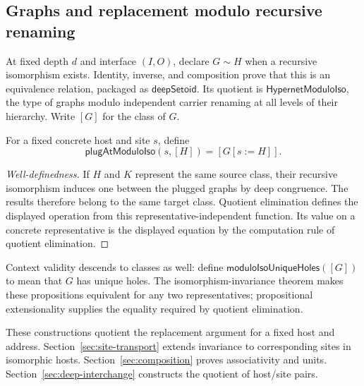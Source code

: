 \subsection{Graphs and replacement modulo recursive renaming}

\begin{definition}\label{term:recursive-quotient}
At fixed depth $d$ and interface $(I,O)$, declare $G\sim H$ when a recursive
isomorphism exists. Identity, inverse, and composition prove that this is an
equivalence relation, packaged as $\mathsf{deepSetoid}$. Its quotient is
$\mathsf{HypernetModuloIso}$, the type of graphs modulo independent carrier
renaming at all levels of their hierarchy. Write $[G]$ for the class of $G$.
\end{definition}

\begin{definition}\label{term:quotient-plugging}
For a fixed concrete host and site $s$, define
\[
 \mathsf{plugAtModuloIso}(s,[H])=[G[s:=H]].
\]
\end{definition}
\begin{proof}[Well-definedness]
If $H$ and $K$ represent the same source class, their recursive isomorphism
induces one between the plugged graphs by deep congruence. The results therefore
belong to the same target class. Quotient elimination defines the displayed
operation from this representative-independent function. Its value on a
concrete representative is the displayed equation by the computation rule of
quotient elimination.
\end{proof}
Context validity descends to classes as well: define
$\mathsf{moduloIsoUniqueHoles}([G])$ to mean that $G$ has unique holes. The
isomorphism-invariance theorem makes these propositions equivalent for any two
representatives; propositional extensionality supplies the equality required by
quotient elimination.

These constructions quotient the replacement argument for a fixed host and
address. Section~\ref{sec:site-transport} extends invariance to corresponding sites in
isomorphic hosts. Section~\ref{sec:composition} proves associativity and units.
Section~\ref{sec:deep-interchange} constructs the quotient of host/site pairs.

